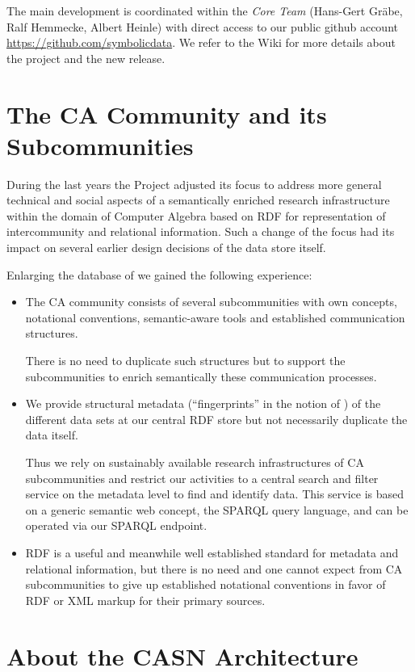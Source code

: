 \documentclass[11pt]{article}
\begin{document}
The main development is coordinated within the \emph{{\SD} Core Team}
(Hans-Gert Gr\"abe, Ralf Hemmecke, Albert Heinle) with direct access to our
public github account \url{https://github.com/symbolicdata}.  We refer to the
{\SD} Wiki \cite{sdwiki} for more details about the project and the new
release.

\section{The CA Community and its Subcommunities}

During the last years the {\SD} Project adjusted its focus to address more
general technical and social aspects of a semantically enriched research
infrastructure within the domain of Computer Algebra based on RDF for
representation of intercommunity and relational information.  Such a change of
the focus had its impact on several earlier design decisions of the data store
itself. 

Enlarging the database of {\SD} we gained the following experience:
\begin{itemize}
\item The CA community consists of several subcommunities with own concepts,
  notational conventions, semantic-aware tools and established communication
  structures.  

  There is no need to duplicate such structures but to support the
  subcommunities to enrich semantically these communication processes.
\item We provide structural metadata (``fingerprints'' in the notion of
  \cite{cicm-14}) of the different data sets at our central RDF store but not
  necessarily duplicate the data itself.

  Thus we rely on sustainably available research infrastructures of CA
  subcommunities and restrict our activities to a central search and filter
  service on the metadata level to find and identify data. This service is
  based on a generic semantic web concept, the SPARQL query language, and can
  be operated via our SPARQL endpoint.
\item RDF is a useful and meanwhile well established standard for metadata and
  relational information, but there is no need and one cannot expect from CA
  subcommunities to give up established notational conventions in favor of
  RDF or XML markup for their primary sources. 
\end{itemize}

\section{About the CASN Architecture}
\end{document}
